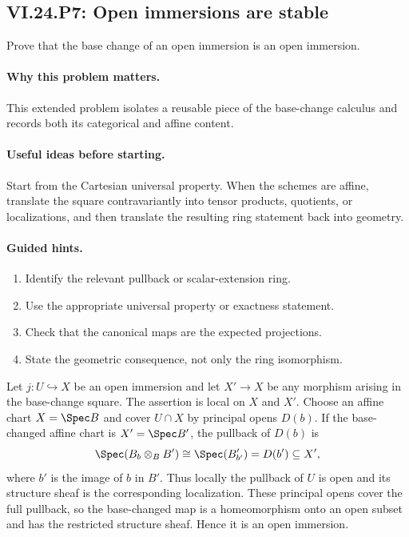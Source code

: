 \subsection*{VI.24.P7: Open immersions are stable}
\begin{problem}\label{prob:vi24-p07}
Prove that the base change of an open immersion is an open immersion.
\end{problem}

\ifdefined\FullProblemDossiers
\paragraph{Why this problem matters.}
This extended problem isolates a reusable piece of the base-change calculus and records both its categorical and affine content.

\paragraph{Useful ideas before starting.}
Start from the Cartesian universal property.  When the schemes are affine, translate the square contravariantly into tensor products, quotients, or localizations, and then translate the resulting ring statement back into geometry.

\paragraph{Guided hints.}
\begin{enumerate}
\item Identify the relevant pullback or scalar-extension ring.
\item Use the appropriate universal property or exactness statement.
\item Check that the canonical maps are the expected projections.
\item State the geometric consequence, not only the ring isomorphism.
\end{enumerate}

\begin{solution}
Let $j:U\hookrightarrow X$ be an open immersion and let $X'\to X$ be any morphism arising in the base-change square.  The assertion is local on $X$ and $X'$.  Choose an affine chart $X=\Spec B$ and cover $U\cap X$ by principal opens $D(b)$.  If the base-changed affine chart is $X'=\Spec B'$, the pullback of $D(b)$ is
\[
\Spec(B_b\otimes_BB')\cong\Spec(B'_{b'})=D(b')\subseteq X',
\]
where $b'$ is the image of $b$ in $B'$.  Thus locally the pullback of $U$ is open and its structure sheaf is the corresponding localization.  These principal opens cover the full pullback, so the base-changed map is a homeomorphism onto an open subset and has the restricted structure sheaf.  Hence it is an open immersion.
\end{solution}

